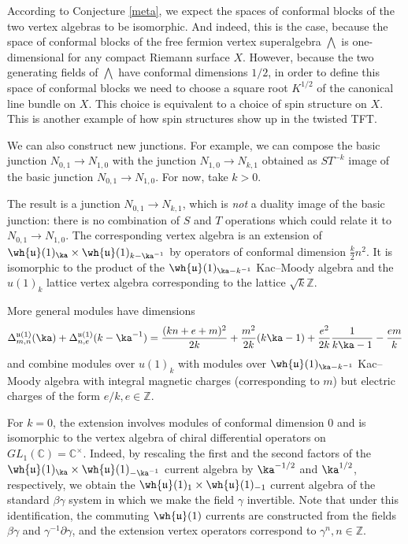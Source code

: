 \documentclass[11pt,reqno]{amsart}
\theoremstyle{plain}
\numberwithin{equation}{section}
\newcommand{\C}{\mathbb{C}}
\newcommand{\Z}{\mathbb{Z}}
\theoremstyle{definition}
\begin{document}
According to Conjecture \ref{meta}, we expect the spaces of
conformal blocks of the two vertex algebras to be isomorphic. And
indeed, this is the case, because the space of conformal blocks of the
free fermion vertex superalgebra $\bigwedge$ is one-dimensional for
any compact Riemann surface $X$. However, because the two generating
fields of $\bigwedge$ have conformal dimensions $1/2$, in order to
define this space of conformal blocks we need to choose a square root
$K^{1/2}$ of the canonical line bundle on $X$. This choice is
equivalent to a choice of spin structure on $X$. This is another
example of how spin structures show up in the twisted TFT.

We can also construct new junctions. For example, we can
compose the basic junction $N_{0,1} \to N_{1,0}$ with the junction
$N_{1,0} \to N_{k,1}$ obtained as $ST^{-k}$ image of the basic
junction $N_{0,1} \to N_{1,0}$. For now, take $k>0$. 

The result is a junction $N_{0,1} \to N_{k,1}$, which is {\it not} a
duality image of the basic junction: there is no combination of $S$ and $T$ operations which could relate it to 
$N_{0,1} \to N_{1,0}$.  The corresponding vertex algebra
is an extension of $\wh{\mathfrak{u}}(1)_{\ka} \times
\wh{\mathfrak{u}}(1)_{k - \ka^{-1}}$ by operators of conformal
dimension $\frac{k}{2} n^2$. It is isomorphic to the product of the
$\wh{\mathfrak{u}}(1)_{\ka - k^{-1}}$ Kac--Moody algebra and the
$u(1)_k$ lattice vertex algebra corresponding to the lattice
$\sqrt{k}\Z$.

More general modules have dimensions
\begin{equation}
\Delta^{\mathfrak{u}(1)}_{m,n}(\ka) +
\Delta^{\mathfrak{u}(1)}_{n,e}(k-\ka^{-1}) = \frac{(k n+e+m)^2}{2 k} +
\frac{m^2 }{2k}(k \ka-1) + \frac{e^2}{2k} \frac{1}{k \ka-1}- \frac{e
  m}{k}
\end{equation}
and combine modules over $u(1)_k$ with modules over
$\wh{\mathfrak{u}}(1)_{\ka - k^{-1}}$ Kac--Moody algebra with integral
magnetic charges (corresponding to $m$) but electric charges of the
form $e/k, e \in \Z$.

For $k=0$, the extension involves modules of conformal dimension $0$
and is isomorphic to the vertex algebra of chiral differential
operators on $GL_1(\C)=\C^\times$. Indeed, by rescaling the first and
the second factors of the $\wh{\mathfrak{u}}(1)_{\ka} \times
\wh{\mathfrak{u}}(1)_{- \ka^{-1}}$ current algebra by $\ka^{-1/2}$ and
$\ka^{1/2}$, respectively, we obtain the $\wh{\mathfrak{u}}(1)_{1}
\times \wh{\mathfrak{u}}(1)_{-1}$ current algebra of the standard
$\beta \gamma$ system in which we make the field $\gamma$
invertible. Note that under this identification, the commuting
$\wh{\mathfrak{u}}(1)$ currents are constructed from the fields
$\beta\gamma$ and $\gamma^{-1} \partial \gamma$, and the extension
vertex operators correspond to $\gamma^n, n \in \Z$.
\end{document}
